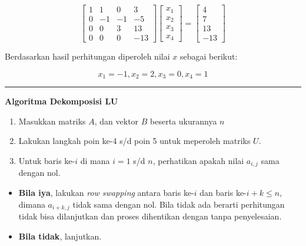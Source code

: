 \documentclass[]{book}
\providecommand{\tightlist}{%
  \setlength{\itemsep}{0pt}\setlength{\parskip}{0pt}}
\theoremstyle{definition}
\theoremstyle{definition}
\theoremstyle{definition}
\theoremstyle{remark}
\begin{document}
\begin{equation*}
\begin{bmatrix}
     1       & 1       & 0       & 3           \\[0.3em]
     0       & -1      & -1      & -5          \\[0.3em]
     0       & 0       & 3       & 13          \\[0.3em]
     0       & 0       & 0       & -13
     \end{bmatrix}
\begin{bmatrix}
     x_1                                          \\[0.3em]
     x_2                                          \\[0.3em]
     x_3                                          \\[0.3em]
     x_4                                       
     \end{bmatrix}
= \begin{bmatrix}
     4                                          \\[0.3em]
     7                                          \\[0.3em]
     13                                          \\[0.3em]
     -13                      
     \end{bmatrix}
\end{equation*}

Berdasarkan hasil perhitungan diperoleh nilai \(x\) sebagai berikut:

\[
x_1=-1, x_2=2, x_3=0, x_4=1
\]

\begin{center}\rule{0.5\linewidth}{\linethickness}\end{center}

\textbf{Algoritma Dekomposisi LU}

\begin{enumerate}
\def\labelenumi{\arabic{enumi}.}
\tightlist
\item
  Masukkan matriks \(A\), dan vektor \(B\) beserta ukurannya \(n\)
\item
  Lakukan langkah poin ke-4 s/d poin 5 untuk meperoleh matriks \(U\).
\item
  Untuk baris ke-\(i\) di mana \(i=1\) s/d \(n\), perhatikan apakah nilai \(a_{i,j}\) sama dengan nol.
\end{enumerate}

\begin{itemize}
\tightlist
\item
  \textbf{Bila iya}, lakukan \emph{row swapping} antara baris ke-\(i\) dan baris ke-\(i+k\leq n\), dimana \(a_{i+k,j}\) tidak sama dengan nol. Bila tidak ada berarti perhitungan tidak bisa dilanjutkan dan proses dihentikan dengan tanpa penyelesaian.
\item
  \textbf{Bila tidak}, lanjutkan.
\end{itemize}
\end{document}

